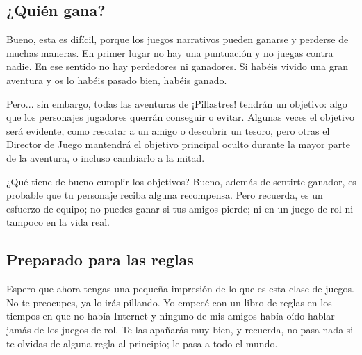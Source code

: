 \subsection{¿Quién gana?}
Bueno, esta es difícil, porque los juegos narrativos pueden ganarse y perderse de muchas maneras. En primer lugar no hay una puntuación y no juegas contra nadie. En ese sentido no hay perdedores ni ganadores. Si habéis vivido una gran aventura y os lo habéis pasado bien, habéis ganado.

Pero... sin embargo, todas las aventuras de ¡Pillastres! tendrán un objetivo: algo que los personajes jugadores querrán conseguir o evitar. Algunas veces el objetivo será evidente, como rescatar a un amigo o descubrir un tesoro, pero otras el Director de Juego mantendrá el objetivo principal oculto durante la mayor parte de la aventura, o incluso cambiarlo a la mitad.

¿Qué tiene de bueno cumplir los objetivos? Bueno, además de sentirte ganador, es probable que tu personaje reciba alguna recompensa. Pero recuerda, es un esfuerzo de equipo; no puedes ganar si tus amigos pierde; ni en un juego de rol ni tampoco en la vida real.

\subsection{Preparado para las reglas}

Espero que ahora tengas una pequeña impresión de lo que es esta clase de juegos. No te preocupes, ya lo irás pillando. Yo empecé con un libro de reglas en los tiempos en que no había Internet y ninguno de mis amigos había oído hablar jamás de los juegos de rol. Te las apañarás muy bien, y recuerda, no pasa nada si te olvidas de alguna regla al principio; le pasa a todo el mundo.
